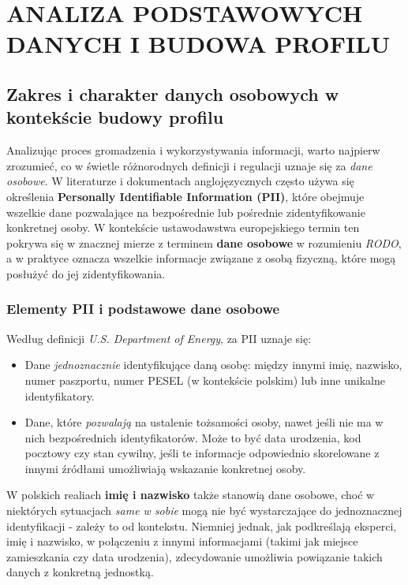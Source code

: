 \chapter{ANALIZA PODSTAWOWYCH DANYCH I BUDOWA PROFILU}

\section{Zakres i charakter danych osobowych w kontekście budowy profilu}

Analizując proces gromadzenia i wykorzystywania informacji, warto najpierw zrozumieć, co w świetle różnorodnych definicji i regulacji uznaje się za \emph{dane osobowe}. W literaturze i dokumentach anglojęzycznych często używa się określenia \textbf{Personally Identifiable Information (PII)}\cite{PII_USDE}, które obejmuje wszelkie dane pozwalające na bezpośrednie lub pośrednie zidentyfikowanie konkretnej osoby. W kontekście ustawodawstwa europejskiego termin ten pokrywa się w znacznej mierze z terminem \textbf{dane osobowe} w rozumieniu \emph{RODO}, a w praktyce oznacza wszelkie informacje związane z osobą fizyczną, które mogą posłużyć do jej zidentyfikowania.

\subsection{Elementy PII i podstawowe dane osobowe}
Według definicji \emph{U.S. Department of Energy}\cite{PII_USDE}, za PII uznaje się:
\begin{itemize}
    \item Dane \emph{jednoznacznie} identyfikujące daną osobę: między innymi imię, nazwisko, numer paszportu, numer PESEL (w kontekście polskim) lub inne unikalne identyfikatory.
    \item Dane, które \emph{pozwalają} na ustalenie tożsamości osoby, nawet jeśli nie ma w nich bezpośrednich identyfikatorów. Może to być data urodzenia, kod pocztowy czy stan cywilny, jeśli te informacje odpowiednio skorelowane z innymi źródłami umożliwiają wskazanie konkretnej osoby.
\end{itemize}

W polskich realiach \textbf{imię i nazwisko} także stanowią dane osobowe, choć w niektórych sytuacjach \emph{same w sobie} mogą nie być wystarczające do jednoznacznej identyfikacji - zależy to od kontekstu. Niemniej jednak, jak podkreślają eksperci\cite{LEXDIGITAL_CZY_IMIE_NAZW_TO_DANE_OS}, imię i nazwisko, w połączeniu z innymi informacjami (takimi jak miejsce zamieszkania czy data urodzenia), zdecydowanie umożliwia powiązanie takich danych z konkretną jednostką.

